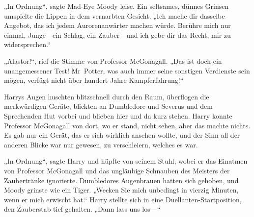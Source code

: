 „In Ordnung“, sagte Mad-Eye Moody leise. Ein seltsames, dünnes Grinsen umspielte die Lippen in dem vernarbten Gesicht. „Ich mache dir dasselbe Angebot, das ich jedem Aurorenanwärter machen würde. Berühre mich nur einmal, Junge—ein Schlag, ein Zauber—und ich gebe dir das Recht, mir zu widersprechen.“

„Alastor!“, rief die Stimme von Professor McGonagall. „Das ist doch ein unangemessener Test! Mr~Potter, was auch immer seine sonstigen Verdienste sein mögen, verfügt nicht über hundert Jahre Kampferfahrung!“

Harrys Augen huschten blitzschnell durch den Raum, überflogen die merkwürdigen Geräte, blickten an Dumbledore und Severus und dem Sprechenden Hut vorbei und blieben hier und da kurz stehen. Harry konnte Professor McGonagall von dort, wo er stand, nicht sehen, aber das machte nichts. Es gab nur ein Gerät, das er sich wirklich ansehen wollte, und der Sinn all der anderen Blicke war nur gewesen, zu verschleiern, welches es war.

„In Ordnung“, sagte Harry und hüpfte von seinem Stuhl, wobei er das Einatmen von Professor McGonagall und das ungläubige Schnauben des Meisters der Zaubertränke ignorierte. Dumbledores Augenbrauen hatten sich gehoben, und Moody grinste wie ein Tiger. „Wecken Sie mich unbedingt in vierzig Minuten, wenn er mich erwischt hat.“
Harry stellte sich in eine Duellanten-Startposition, den Zauberstab tief gehalten.
„Dann lass uns los—“

